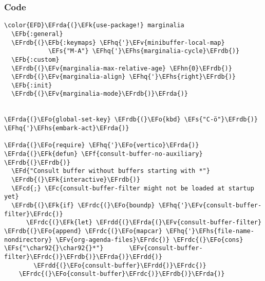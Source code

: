 \documentclass[a4wide,10pt]{article}
\newcommand{\EFc}[1]{\textcolor{EFc}{#1}} %
\newcommand{\EFcd}[1]{\textcolor{EFcd}{#1}} %
\newcommand{\EFs}[1]{\textcolor{EFs}{#1}} %
\newcommand{\EFd}[1]{\textcolor{EFd}{#1}} %
\newcommand{\EFk}[1]{\textcolor{EFk}{#1}} %
\newcommand{\EFb}[1]{\textcolor{EFb}{#1}} %
\newcommand{\EFf}[1]{\textcolor{EFf}{#1}} %
\newcommand{\EFv}[1]{\textcolor{EFv}{#1}} %
\newcommand{\EFo}[1]{\textcolor{EFo}{#1}} %
\newcommand{\EFhn}[1]{\textcolor{EFhn}{\textbf{#1}}} %
\newcommand{\EFhq}[1]{\textcolor{EFhq}{#1}} %
\newcommand{\EFhs}[1]{\textcolor{EFhs}{#1}} %
\newcommand{\EFrda}[1]{\textcolor{EFrda}{#1}} %
\newcommand{\EFrdb}[1]{\textcolor{EFrdb}{#1}} %
\newcommand{\EFrdc}[1]{\textcolor{EFrdc}{#1}} %
\newcommand{\EFrdd}[1]{\textcolor{EFrdd}{#1}} %
\begin{document}
\subsubsection{Code}
\label{sec:orgffc9fd8}
\begin{Code}
\begin{Verbatim}
\color{EFD}\EFrda{(}\EFk{use-package!} marginalia
  \EFb{:general}
  \EFrdb{(}\EFb{:keymaps} \EFhq{'}\EFv{minibuffer-local-map}
            \EFs{"M-A"} \EFhq{'}\EFhs{marginalia-cycle}\EFrdb{)}
  \EFb{:custom}
  \EFrdb{(}\EFv{marginalia-max-relative-age} \EFhn{0}\EFrdb{)}
  \EFrdb{(}\EFv{marginalia-align} \EFhq{'}\EFhs{right}\EFrdb{)}
  \EFb{:init}
  \EFrdb{(}\EFv{marginalia-mode}\EFrdb{)}\EFrda{)}


\EFrda{(}\EFo{global-set-key} \EFrdb{(}\EFo{kbd} \EFs{"C-ö"}\EFrdb{)} \EFhq{'}\EFhs{embark-act}\EFrda{)}

\EFrda{(}\EFo{require} \EFhq{'}\EFo{vertico}\EFrda{)}
\EFrda{(}\EFk{defun} \EFf{consult-buffer-no-auxiliary} \EFrdb{(}\EFrdb{)}
  \EFd{"Consult buffer without buffers starting with *"}
  \EFrdb{(}\EFk{interactive}\EFrdb{)}
  \EFcd{;} \EFc{consult-buffer-filter might not be loaded at startup yet}
  \EFrdb{(}\EFk{if} \EFrdc{(}\EFo{boundp} \EFhq{'}\EFv{consult-buffer-filter}\EFrdc{)}
      \EFrdc{(}\EFk{let} \EFrdd{(}\EFrda{(}\EFv{consult-buffer-filter}    \EFrdb{(}\EFo{append} \EFrdc{(}\EFo{mapcar} \EFhq{'}\EFhs{file-name-nondirectory} \EFv{org-agenda-files}\EFrdc{)} \EFrdc{(}\EFo{cons} \EFs{"\char92{}\char92{}*"}       \EFv{consult-buffer-filter}\EFrdc{)}\EFrdb{)}\EFrda{)}\EFrdd{)}
        \EFrdd{(}\EFo{consult-buffer}\EFrdd{)}\EFrdc{)}
    \EFrdc{(}\EFo{consult-buffer}\EFrdc{)}\EFrdb{)}\EFrda{)}


\end{Verbatim}
\end{Code}
\end{document}
